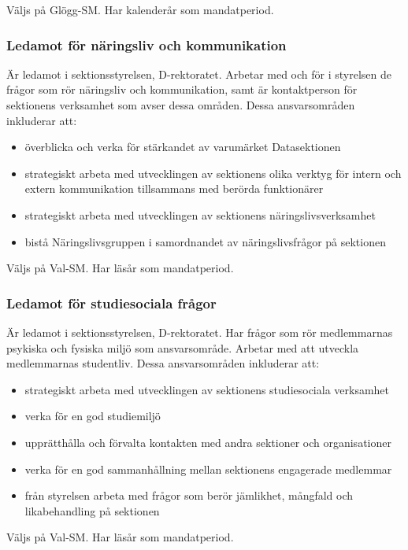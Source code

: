 \documentclass{dgovdoc}
\begin{document}
Väljs på Glögg-SM. Har kalenderår som mandatperiod.

\subsubsection{Ledamot för näringsliv och kommunikation}

Är ledamot i sektionsstyrelsen, D-rektoratet. Arbetar med och för i styrelsen de frågor
som rör näringsliv och kommunikation, samt är kontaktperson för sektionens verksamhet
som avser dessa områden. Dessa ansvarsområden inkluderar att:
\begin{itemize}
  \item överblicka och verka för stärkandet av varumärket Datasektionen
  \item strategiskt arbeta med utvecklingen av sektionens olika verktyg för intern och extern kommunikation tillsammans med berörda funktionärer
  \item strategiskt arbeta med utvecklingen av sektionens näringslivsverksamhet
\item bistå Näringslivsgruppen i samordnandet av näringslivsfrågor på sektionen
\end{itemize}

Väljs på Val-SM. Har läsår som mandatperiod.

\subsubsection{Ledamot för studiesociala frågor}

Är ledamot i sektionsstyrelsen, D-rektoratet. Har frågor som rör medlemmarnas psykiska
och fysiska miljö som ansvarsområde. Arbetar med att utveckla medlemmarnas
studentliv. Dessa ansvarsområden inkluderar att:

\begin{itemize}
  \item strategiskt arbeta med utvecklingen av sektionens studiesociala verksamhet
  \item verka för en god studiemiljö
  \item upprätthålla och förvalta kontakten med andra sektioner och organisationer
  \item verka för en god sammanhållning mellan sektionens engagerade medlemmar
  \item från styrelsen arbeta med frågor som berör jämlikhet, mångfald och likabehandling på sektionen
\end{itemize}

Väljs på Val-SM. Har läsår som mandatperiod.
\end{document}
